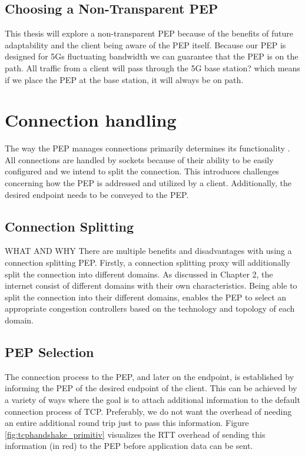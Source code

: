 \documentclass[a4paper,english, 11pt]{report}
\begin{document}
\subsection{Choosing a Non-Transparent PEP}
This thesis will explore a non-transparent PEP because of the benefits of future adaptability and the client being aware of the PEP itself. Because our PEP is designed for 5Gs fluctuating bandwidth we can guarantee that the PEP is on the path. All traffic from a client will pass through the 5G base station? which means if we place the PEP at the base station, it will always be on path.

\section{Connection handling}
The way the PEP manages connections primarily determines its functionality \cite{rfc3135_pep}. All connections are handled by sockets because of their ability to be easily configured and we intend to split the connection. This introduces challenges concerning how the PEP is addressed and utilized by a client. Additionally, the desired endpoint needs to be conveyed to the PEP. 

\subsection{Connection Splitting} WHAT AND WHY
There are multiple benefits and disadvantages with using a connection splitting PEP. Firstly, a connection splitting proxy will additionally split the connection into different domains. As discussed in Chapter 2, the internet consist of different domains with their own characteristics. Being able to split the connection into their different domains, enables the PEP to select an appropriate congestion controllers based on the technology and topology of each domain.\\

\subsection{PEP Selection}
The connection process to the PEP, and later on the endpoint, is established by informing the PEP of the desired endpoint of the client. This can be achieved by a variety of ways where the goal is to attach additional information to the default connection process of TCP. Preferably, we do not want the overhead of needing an entire additional round trip just to pass this information. Figure \ref{fig:tcphandshake_primitiv} visualizes the RTT overhead of sending this information (in red) to the PEP before application data can be sent.\\
\end{document}
